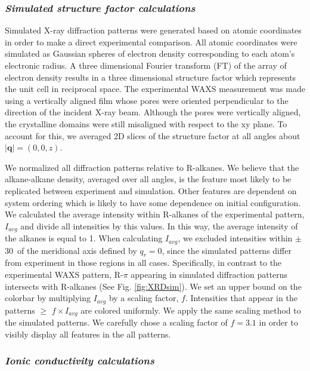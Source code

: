 \documentclass[journal=jpcbfk,manusciprt=article]{achemso}
\begin{document}
  \subsubsection{\textit{Simulated structure factor calculations}}\label{method:xrd}

  Simulated X-ray diffraction patterns were generated based on atomic
  coordinates in order to make a direct experimental comparison. All atomic
  coordinates were simulated as Gaussian spheres of electron density
  corresponding to each atom's electronic radius. A three dimensional Fourier
  transform (FT) of the array of electron density results in a three dimensional
  structure factor which represents the unit cell in reciprocal space. The
  experimental WAXS measurement was made using a vertically aligned film whose 
  pores were oriented perpendicular to the direction of the incident X-ray beam. 
  Although the pores were vertically aligned, the crystalline domains were still
  misaligned with respect to the xy plane. To account for this, we averaged
  2D slices of the structure factor at all angles about $|\mathbf{q}| = (0, 0, z)$. 

  We normalized all diffraction patterns relative to R-alkanes. We believe that the
  alkane-alkane density, averaged over all angles, is the feature most likely to be
  replicated between experiment and simulation. Other features are dependent on 
  system ordering which is likely to have some dependence on initial configuration. 
  We calculated the average intensity within R-alkanes of the experimental pattern,
  $I_{avg}$ and divide all intensities by this values. In this way, the average intensity
  of the alkanes is equal to 1. When calculating $I_{avg}$, we excluded intensities 
  within $\pm$ 30\degree~of the meridional axis defined by $q_r=0$, since the simulated
  patterns differ from experiment in those regions in all cases. Specifically, in contrast
  to the experimental WAXS pattern, R-$\pi$ appearing in simulated diffraction patterns 
  intersects with R-alkanes (See Fig. \ref{fig:XRDsim}). We set
  an upper bound on the colorbar by multiplying $I_{avg}$ by a scaling factor, $f$. 
  Intensities that appear in the patterns $\geq$ $f\times I_{avg}$ are colored uniformly. 
  We apply the same scaling method to the simulated patterns. We carefully chose a scaling
  factor of $f=3.1$ in order to visibly display all features in the all patterns.

  \subsubsection{\textit{Ionic conductivity calculations}}
\end{document}
